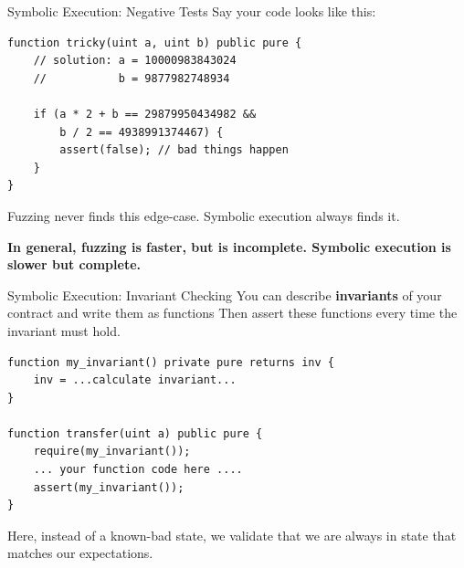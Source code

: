 \documentclass[aspectratio=169]{beamer}
\begin{document}
%
%
%

\begin{frame}[fragile=singleslide]{Symbolic Execution: Negative Tests}
Say your code looks like this:

\begin{Verbatim}[frame=single, framerule=0.2mm, framesep=2mm,fontsize=\small]
function tricky(uint a, uint b) public pure {
	// solution: a = 10000983843024
	//           b = 9877982748934
	
	if (a * 2 + b == 29879950434982 &&
	    b / 2 == 4938991374467) {
		assert(false); // bad things happen
	}
}
\end{Verbatim}

Fuzzing never finds this edge-case. Symbolic execution always finds it.
\bigskip 

\textbf{In general, fuzzing is faster, but is incomplete. Symbolic execution is slower but complete.}

\end{frame}

\begin{frame}[fragile=singleslide]{Symbolic Execution: Invariant Checking}
You can describe \textbf{invariants} of your contract and write them as functions Then assert these functions every time the invariant must hold.
\begin{Verbatim}[frame=single, framerule=0.2mm, framesep=2mm,fontsize=\small]
function my_invariant() private pure returns inv {
	inv = ...calculate invariant...
}
	
function transfer(uint a) public pure {
	require(my_invariant());
	... your function code here ....
	assert(my_invariant());
}
\end{Verbatim}

Here, instead of a known-bad state, we validate that we are always in state that matches our expectations.
\end{frame}	
\end{document}
